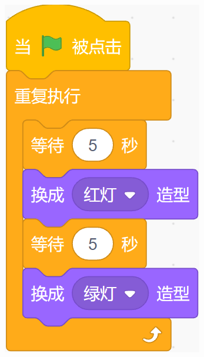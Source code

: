 \documentclass[10pt, a4paper]{article}
\begin{document}
\begin{enumerate}
        \begin{figure}[htbp]
            \centering
            \begin{minipage}[t]{.28\textwidth}
                \centering
                \begin{minipage}[t]{.4\textwidth}
                    \centering
                    \includegraphics[width=\textwidth]{8-1.png}
                \end{minipage}
                \begin{minipage}[t]{.55\textwidth}

\end{minipage}
\end{minipage}
\end{figure}
\end{enumerate}
\end{document}
